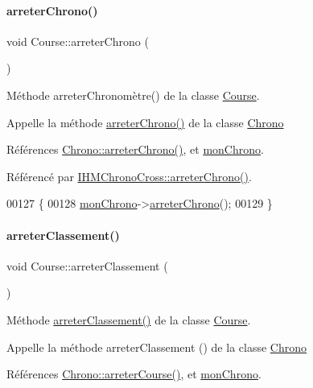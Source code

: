 \paragraph{\texorpdfstring{arreter\+Chrono()}{arreterChrono()}}
{\footnotesize\ttfamily void Course\+::arreter\+Chrono (\begin{DoxyParamCaption}{ }\end{DoxyParamCaption})}



Méthode arreter\+Chronomètre() de la classe \hyperlink{class_course}{Course}. 

Appelle la méthode \hyperlink{class_course_a939635ac8301a7018475cc2ce347375f}{arreter\+Chrono()} de la classe \hyperlink{class_chrono}{Chrono} 

Références \hyperlink{class_chrono_a5e2781ab78dcaa0ecb37e301399d819b}{Chrono\+::arreter\+Chrono()}, et \hyperlink{class_course_a0c9b246b0f1ec612bd6e6c613a94d52b}{mon\+Chrono}.



Référencé par \hyperlink{class_i_h_m_chrono_cross_a8d5c89a4d2ca34252acd8737e29d37fe}{I\+H\+M\+Chrono\+Cross\+::arreter\+Chrono()}.


\begin{DoxyCode}
00127 \{
00128     \hyperlink{class_course_a0c9b246b0f1ec612bd6e6c613a94d52b}{monChrono}->\hyperlink{class_chrono_a5e2781ab78dcaa0ecb37e301399d819b}{arreterChrono}();
00129 \}
\end{DoxyCode}
\mbox{\label{class_course_a4426310a411d8ecf7f4a2dc64c24a42d}} 
\paragraph{\texorpdfstring{arreter\+Classement()}{arreterClassement()}}
{\footnotesize\ttfamily void Course\+::arreter\+Classement (\begin{DoxyParamCaption}{ }\end{DoxyParamCaption})}



Méthode \hyperlink{class_course_a4426310a411d8ecf7f4a2dc64c24a42d}{arreter\+Classement()} de la classe \hyperlink{class_course}{Course}. 

Appelle la méthode arreter\+Classement () de la classe \hyperlink{class_chrono}{Chrono} 

Références \hyperlink{class_chrono_a2a0d899b09eb044caa83b41574ac5edf}{Chrono\+::arreter\+Course()}, et \hyperlink{class_course_a0c9b246b0f1ec612bd6e6c613a94d52b}{mon\+Chrono}.



